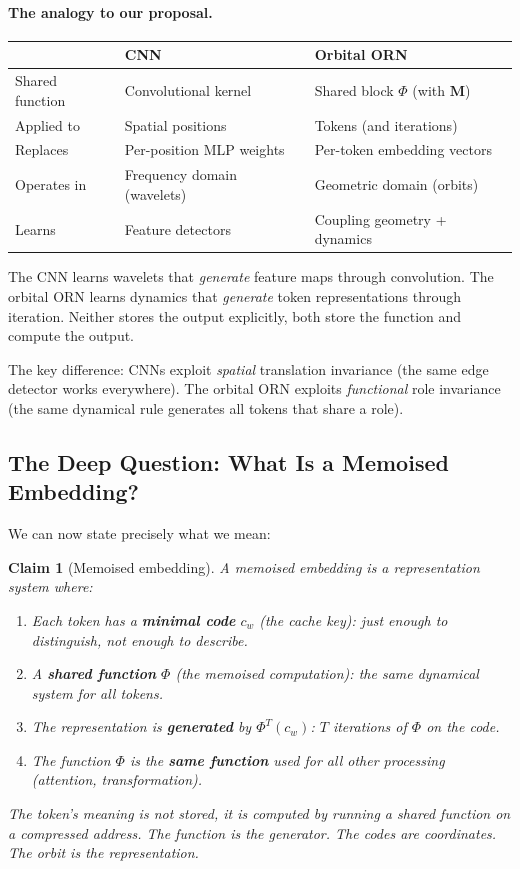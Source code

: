 \documentclass[11pt, a4paper]{article}
\newcommand{\M}{\mathbf{M}}
\newtheorem{claim}{Claim}
\theoremstyle{remark}
\begin{document}
\paragraph{The analogy to our proposal.}
\begin{center}\small
\begin{tabular}{@{}lll@{}}
\toprule
& \textbf{CNN} & \textbf{Orbital ORN} \\
\midrule
Shared function & Convolutional kernel & Shared block $\Phi$ (with $\M$) \\
Applied to & Spatial positions & Tokens (and iterations) \\
Replaces & Per-position MLP weights & Per-token embedding vectors \\
Operates in & Frequency domain (wavelets) & Geometric domain (orbits) \\
Learns & Feature detectors & Coupling geometry + dynamics \\
\bottomrule
\end{tabular}
\end{center}

The CNN learns wavelets that \emph{generate} feature maps through convolution.
The orbital ORN learns dynamics that \emph{generate} token representations through iteration.
Neither stores the output explicitly, both store the function and compute the output.

The key difference: CNNs exploit \emph{spatial} translation invariance (the same edge detector works everywhere).
The orbital ORN exploits \emph{functional} role invariance (the same dynamical rule generates all tokens that share a role).

\subsection{The Deep Question: What Is a Memoised Embedding?}

We can now state precisely what we mean:

\begin{claim}[Memoised embedding]
A memoised embedding is a representation system where:
\begin{enumerate}[nosep]
    \item Each token has a \textbf{minimal code} $c_w$ (the cache key): just enough to distinguish, not enough to describe.
    \item A \textbf{shared function} $\Phi$ (the memoised computation): the same dynamical system for all tokens.
    \item The representation is \textbf{generated} by $\Phi^T(c_w)$: $T$ iterations of $\Phi$ on the code.
    \item The function $\Phi$ is the \textbf{same function} used for all other processing (attention, transformation).
\end{enumerate}
The token's meaning is not stored, it is \emph{computed} by running a shared function on a compressed address.
The function is the generator.
The codes are coordinates.
The orbit is the representation.
\end{claim}
\end{document}
